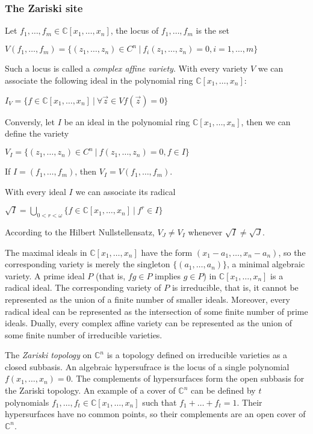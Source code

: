 \documentclass[a4paper]{article}
\theoremstyle{defin}
\theoremstyle{theorem}
\theoremstyle{claim}
\theoremstyle{prop}
\theoremstyle{lemma}
\theoremstyle{fact}
\theoremstyle{ex}
\theoremstyle{col}
\begin{document}
\subsubsection{The Zariski site}

Let $f_1, \dots, f_m \in \mathbb{C}[x_1, \dots, x_n]$, the locus of $f_1, \dots, f_m$ is the set
\begin{center}
$V(f_1, \dots, f_m) = \{ (z_1, \dots, z_n) \in C^n \: | \: f_i(z_1, \dots, z_n) = 0, i = 1, \dots, m \}$
\end{center}
Such a locus is called a \emph{complex affine variety}. With every variety $V$ we can associate the following ideal in the polynomial ring $\mathbb{C}[x_1, \dots, x_n]$:
\begin{center}
$I_V = \{ f \in \mathbb{C}[x_1, \dots, x_n] \: | \: \forall \vec{z} \in V f(\vec{z}) = 0 \}$
\end{center}
Conversly, let $I$ be an ideal in the polynomial ring $\mathbb{C}[x_1, \dots, x_n]$, then we can define the variety
\begin{center}
$V_I = \{ (z_1, \dots, z_n) \in C^n \: | \: f(z_1, \dots, z_n) = 0, f \in I \} $
\end{center}
If $I = (f_1, \dots, f_m)$, then $V_I = V(f_1, \dots, f_m)$.

With every ideal $I$ we can associate its radical
\begin{center}
$\sqrt{I} = \bigcup \limits_{0 < r < \omega} \{ f \in \mathbb{C}[x_1, \dots, x_n] \: | \: f^r \in I \}$
\end{center}
According to the Hilbert Nullstellensatz, $V_J \neq V_I$ whenever $\sqrt{I} \neq \sqrt{J}$.

The maximal ideals in $\mathbb{C}[x_1, \dots, x_n]$ have the form $(x_1 - a_1, \dots, x_n - a_n)$, so the corresponding variety is merely the singleton $\{ (a_1, \dots, a_n) \}$, a minimal algebraic variety. A prime ideal $P$ (that is, $fg \in P$ implies $g \in P$) in $\mathbb{C}[x_1, \dots, x_n]$ is a radical ideal. The corresponding variety of $P$ is irreducible, that is, it cannot be represented as the union of a finite number of smaller ideals. Moreover, every radical ideal can be represented as the intersection of some finite number of prime ideals. Dually, every complex affine variety can be represented as the union of some finite number of irreducible varieties.

The \emph{Zariski topology} on $\mathbb{C}^n$ is a topology defined on irreducible varieties as a closed subbasis. An algebraic hypersufrace is the locus of a single polynomial $f(x_1, \dots, x_n) = 0$. The complements of hypersurfaces form the open subbasis for the Zariski topology. An example of a cover of $\mathbb{C}^n$ can be defined by $t$ polynomials $f_1, \dots, f_t \in \mathbb{C}[x_1, \dots, x_n]$ such that $f_1 + \dots + f_t = 1$. Their hypersurfaces have no common points, so their complements are an open cover of $\mathbb{C}^n$.
\end{document}
